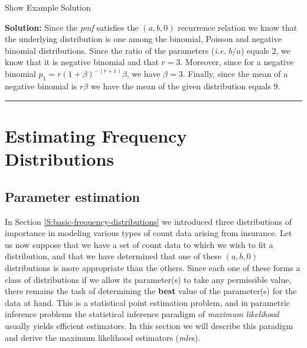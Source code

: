 \documentclass[]{book}
\theoremstyle{definition}
\theoremstyle{definition}
\theoremstyle{definition}
\theoremstyle{remark}
\begin{document}
Show Example Solution

\hypertarget{toggleExampleFreq.3.1}{}
\textbf{Solution:} Since the \emph{pmf} satisfies the \((a,b,0)\)
recurrence relation we know that the underlying distribution is one
among the binomial, Poisson and negative binomial distributions. Since
the ratio of the parameters (\emph{i.e.} \(b/a\)) equals \(2\), we know
that it is negative binomial and that \(r=3\). Moreover, since for a
negative binomial \(p_1=r(1+\beta)^{-(r+1)}\beta\), we have \(\beta=3\).
Finally, since the mean of a negative binomial is \(r\beta\) we have the
mean of the given distribution equals \(9\).

\begin{center}\rule{0.5\linewidth}{\linethickness}\end{center}

\section{Estimating Frequency
Distributions}\label{S:estimating-frequency-distributions}

\subsection{Parameter estimation}\label{S:parameter-estimation}

In Section \ref{S:basic-frequency-distributions} we introduced three
distributions of importance in modeling various types of count data
arising from insurance. Let us now suppose that we have a set of count
data to which we wish to fit a distribution, and that we have determined
that one of these \((a,b,0)\) distributions is more appropriate than the
others. Since each one of these forms a class of distributions if we
allow its parameter(s) to take any permissible value, there remains the
task of determining the \textbf{best} value of the parameter(s) for the
data at hand. This is a statistical point estimation problem, and in
parametric inference problems the statistical inference paradigm of
\emph{maximum likelihood} usually yields efficient estimators. In this
section we will describe this paradigm and derive the maximum likelihood
estimators (\emph{mle}s).
\end{document}
